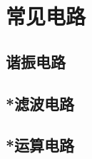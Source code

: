 

\section{常见电路}\label{21-4}

\subsection{谐振电路}\label{21-4-1}

\subsection{*滤波电路}\label{21-4-2}

\subsection{*运算电路}\label{21-4-2}